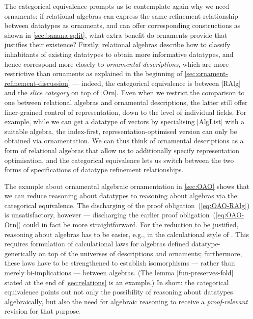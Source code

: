 The categorical equivalence prompts us to contemplate again why we need ornaments: if relational algebras can express the same refinement relationship between datatypes as ornaments, and can offer corresponding constructions as shown in \autoref{sec:banana-split}, what extra benefit do ornaments provide that justifies their existence?
Firstly, relational algebras describe how to classify inhabitants of existing datatypes to obtain more informative datatypes, and hence correspond more closely to \emph{ornamental descriptions}, which are more restrictive than ornaments as explained in the beginning of \autoref{sec:ornament-refinement-discussion} --- indeed, the categorical equivalence is between |RAlg| and the \emph{slice category} on top of |Ōrn|.
Even when we restrict the comparison to one between relational algebras and ornamental descriptions, the latter still offer finer-grained control of representation, down to the level of individual fields.
For example, while we can get a datatype of vectors by specialising |AlgList| with a suitable algebra, the index-first, representation-optimised version can only be obtained via ornamentation.
We can thus think of ornamental descriptions as a form of relational algebras that allow us to additionally specify representation optimisation, and the categorical equivalence lets us switch between the two forms of specifications of datatype refinement relationships.

The example about ornamental algebraic ornamentation in \autoref{sec:OAO} shows that we can reduce reasoning about datatypes to reasoning about algebras via the categorical equivalence.
The discharging of the proof obligation~(\ref{eq:OAO-RAlg}) is unsatisfactory, however --- discharging the earlier proof obligation~(\ref{eq:OAO-Orn}) could in fact be more straightforward.
For the reduction to be justified, reasoning about algebras has to be easier, e.g., in the calculational style of \citet{Bird-AoP}.
This requires formulation of calculational laws for algebras defined datatype-generically on top of the universes of descriptions and ornaments; furthermore, these laws have to be strengthened to establish isomorphisms --- rather than merely bi-implications --- between algebras.
(The lemma |fun-preserves-fold| stated at the end of \autoref{sec:relations} is an example.)
In short: the categorical equivalence points out not only the possibility of reasoning about datatypes algebraically, but also the need for algebraic reasoning to receive a \emph{proof-relevant} revision for that purpose.
